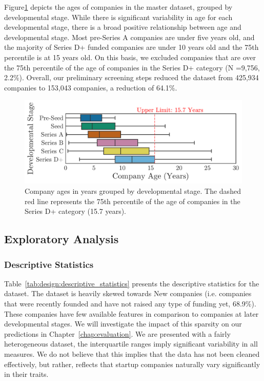 \documentclass[../thesis/thesis.tex]{subfiles}
\begin{document}
Figure\ref{fig:design:stages_ages} depicts the ages of companies in the master dataset, grouped by developmental stage. While there is significant variability in age for each developmental stage, there is a broad positive relationship between age and developmental stage. Most pre-Series A companies are under five years old, and the majority of Series D+ funded companies are under 10 years old and the 75th percentile is at 15 years old. On this basis, we excluded companies that are over the 75th percentile of the age of companies in the Series D+ category (N =9,756, 2.2\%). Overall, our preliminary screening steps reduced the dataset from 425,934 companies to 153,043 companies, a reduction of 64.1\%.

\begin{figure}[!htb]
    \centering
    \includegraphics[width=\textwidth]{../figures/design/descriptives_ages_stage}
    \caption[Company ages by developmental stage]{Company ages in years grouped by developmental stage. The dashed red line represents the 75th percentile of the age of companies in the Series D+ category (15.7 years).}
    \label{fig:design:stages_ages}
\end{figure}

\subsection{Exploratory Analysis}

\subsubsection{Descriptive Statistics}

Table~\ref{tab:design:descriptive_statistics} presents the descriptive statistics for the dataset. The dataset is heavily skewed towards New companies (i.e. companies that were recently founded and have not raised any type of funding yet, 68.9\%). These companies have few available features in comparison to companies at later developmental stages. We will investigate the impact of this sparsity on our predictions in Chapter~\ref{chap:evaluation}. We are presented with a fairly heterogeneous dataset, the interquartile ranges imply significant variability in all measures. We do not believe that this implies that the data has not been cleaned effectively, but rather, reflects that startup companies naturally vary significantly in their traits.
\end{document}
